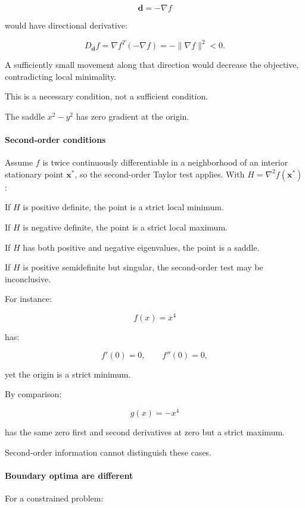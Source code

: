 \[
\mathbf d=-\nabla f
\]

would have directional derivative:

\[
D_{\mathbf d}f = \nabla f^T(-\nabla f) = -\|\nabla f\|^2<0.
\]

A sufficiently small movement along that direction would decrease the objective, contradicting local minimality.

This is a necessary condition, not a sufficient condition.

The saddle \(x^2-y^2\) has zero gradient at the origin.

\paragraph{Second-order conditions}\label{02-foundations-ii-ch026-second-order-conditions}

Assume \(f\) is twice continuously differentiable in a neighborhood of an interior stationary point \(\mathbf x^*\), so the second-order Taylor test applies. With \(H=\nabla^2 f(\mathbf x^*)\):

If \(H\) is positive definite, the point is a strict local minimum.

If \(H\) is negative definite, the point is a strict local maximum.

If \(H\) has both positive and negative eigenvalues, the point is a saddle.

If \(H\) is positive semidefinite but singular, the second-order test may be inconclusive.

For instance:

\[
f(x)=x^4
\]

has:

\[
f'(0)=0,\qquad f''(0)=0,
\]

yet the origin is a strict minimum.

By comparison:

\[
g(x)=-x^4
\]

has the same zero first and second derivatives at zero but a strict maximum.

Second-order information cannot distinguish these cases.

\paragraph{Boundary optima are different}\label{02-foundations-ii-ch026-boundary-optima-are-different}

For a constrained problem:

